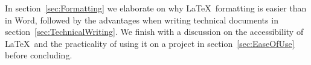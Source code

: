 In section~\ref{sec:Formatting} we elaborate on why \LaTeX\ formatting is easier than in Word, followed by the advantages when writing technical documents in section~\ref{sec:TechnicalWriting}. We finish with a discussion on the accessibility of \LaTeX\ and the practicality of using it on a project in section~\ref{sec:EaseOfUse} before concluding.












